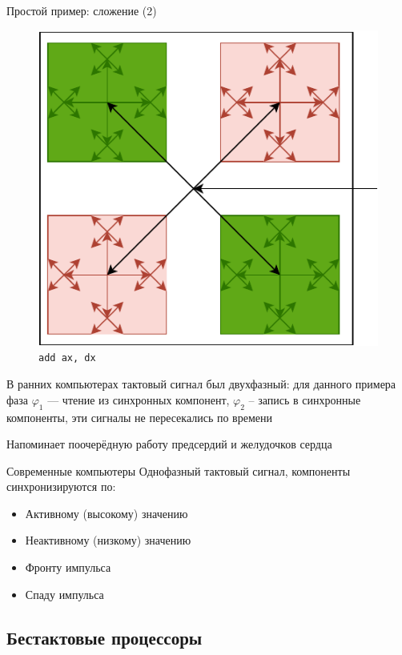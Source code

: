 \documentclass[xetex,aspectratio=43]{beamer}
\begin{document}
\begin{frame}[fragile]{Простой пример: сложение (2)}
    \begin{figure}
        \includegraphics[height=0.4\textheight,page=4]{img/05.clocks.drawio-crop.pdf}
        \caption{\texttt{add ax, dx}}
    \end{figure}

    В ранних компьютерах тактовый сигнал был двухфазный: для данного примера фаза $\varphi_1$ --- чтение из синхронных компонент, $\varphi_2$ -- запись в синхронные компоненты, эти сигналы не пересекались по времени

    \pause

    Напоминает поочерёдную работу предсердий и желудочков сердца
\end{frame}

\begin{frame}{Современные компьютеры}
    Однофазный тактовый сигнал, компоненты синхронизируются по:
    \begin{itemize}
        \item Активному (высокому) значению
        \item Неактивному (низкому) значению
        \item Фронту импульса
        \item Спаду импульса
    \end{itemize}
\end{frame}

\subsection{Бестактовые процессоры}
\end{document}
